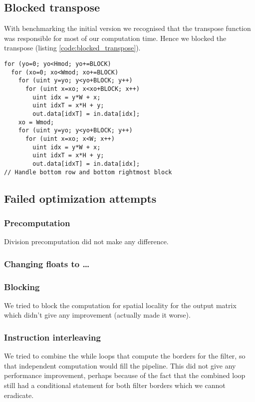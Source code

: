 \subsection{Blocked transpose}
With benchmarking the initial version we recognised that the transpose function was responsible for most of our computation time. Hence we blocked the transpose (listing \ref{code:blocked_transpose}).
\begin{lstlisting}[caption=Transpose block, label=code:blocked_transpose]
for (yo=0; yo<Hmod; yo+=BLOCK)
  for (xo=0; xo<Wmod; xo+=BLOCK)
    for (uint y=yo; y<yo+BLOCK; y++)
      for (uint x=xo; x<xo+BLOCK; x++)
        uint idx = y*W + x;
        uint idxT = x*H + y;
        out.data[idxT] = in.data[idx];
    xo = Wmod;
    for (uint y=yo; y<yo+BLOCK; y++)
      for (uint x=xo; x<W; x++)
        uint idx = y*W + x;
        uint idxT = x*H + y;
        out.data[idxT] = in.data[idx];
// Handle bottom row and bottom rightmost block
\end{lstlisting}


\subsection{Failed optimization attempts}

\subsubsection{Precomputation} Division precomputation did not make any difference.

\subsubsection{Changing floats to \dots}


\subsubsection{Blocking}

We tried to block the computation for spatial locality for the output matrix which didn't give any improvement (actually made it worse).

\subsubsection{Instruction interleaving}

We tried to combine the while loops that compute the borders for the filter, so that independent computation would fill the pipeline. This did not give any performance improvement, perhaps because of the fact that the combined loop still had a conditional statement for both filter borders which we cannot eradicate.

